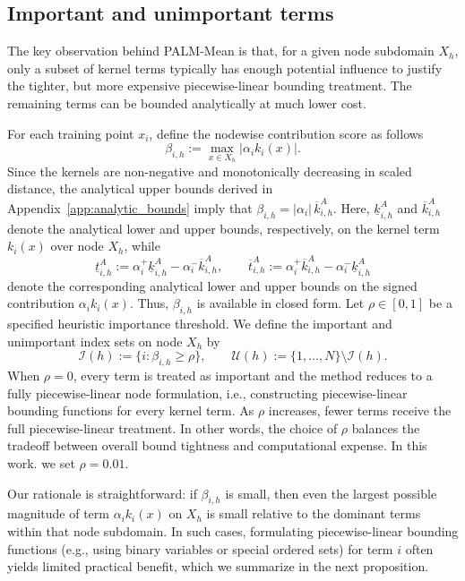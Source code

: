 \documentclass[pdflatex,sn-mathphys-num]{sn-jnl}%
\theoremstyle{thmstyleone}%
\theoremstyle{thmstyletwo}%
\theoremstyle{thmstylethree}%
\begin{document}
\subsection{Important and unimportant terms}
\label{sec:important_terms}
The key observation behind PALM-Mean is that, for a given node subdomain $X_h$, only a subset of kernel terms typically has enough potential influence to justify the tighter, but more expensive piecewise-linear bounding treatment. The remaining terms can be bounded analytically at much lower cost.

For each training point $x_i$, define the nodewise contribution score as follows
\begin{equation}
\beta_{i,h}:=\max_{x\in X_h} |\alpha_i k_i(x)|.
\label{eq:beta_def}
\end{equation}
Since the kernels are non-negative and monotonically decreasing in scaled distance, the analytical upper bounds derived in Appendix~\ref{app:analytic_bounds} imply that $\beta_{i,h}=|\alpha_i|\,\overline{k}_{i,h}^{A}$.
Here, $\underline{k}_{i,h}^{A}$ and $\overline{k}_{i,h}^{A}$ denote the analytical lower and upper bounds, respectively, on the kernel term $k_i(x)$ over node $X_h$, while
\[
\underline{t}_{i,h}^{A}
:=
\alpha_i^+ \underline{k}_{i,h}^{A}
-
\alpha_i^- \overline{k}_{i,h}^{A},
\qquad
\overline{t}_{i,h}^{A}
:=
\alpha_i^+ \overline{k}_{i,h}^{A}
-
\alpha_i^- \underline{k}_{i,h}^{A}
\]
denote the corresponding analytical lower and upper bounds on the signed contribution $\alpha_i k_i(x)$. Thus, $\beta_{i,h}$ is available in closed form. Let
$\rho\in[0,1]$ be a specified heuristic importance threshold. We define the important and unimportant index sets on node $X_h$ by
\[
\mathcal{I}(h):=\{i:\beta_{i,h}\ge \rho\},
\qquad
\mathcal{U}(h):=\{1,\ldots,N\}\setminus \mathcal{I}(h).
\]
When $\rho=0$, every term is treated as important and the method reduces to a fully piecewise-linear node formulation, i.e., constructing piecewise-linear bounding functions for every kernel term. As $\rho$ increases, fewer terms receive the full piecewise-linear treatment. 
In other words, the choice of $\rho$ balances the tradeoff between overall bound tightness and computational expense. In this work. we set $\rho=0.01$.

Our rationale is straightforward: if $\beta_{i,h}$ is small, then even the largest possible magnitude of term $\alpha_i k_i(x)$ on $X_h$ is small relative to the dominant terms within that node subdomain. In such cases, formulating piecewise-linear bounding functions (e.g., using binary variables or special ordered sets) for term $i$ often yields limited practical benefit, which we summarize in the next proposition. 
\end{document}
